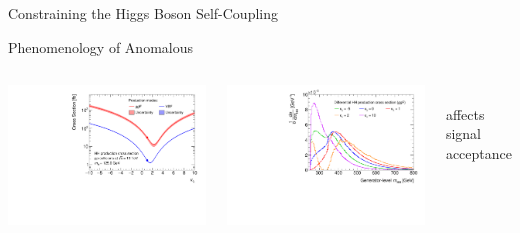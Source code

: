\documentclass[11pt, xcolor={dvipsnames}, aspectratio=169, notes]{beamer}
\begin{document}

\begin{frame}[standout]
  Constraining the Higgs Boson Self-Coupling
\end{frame}


\begin{frame}{Phenomenology of Anomalous \allbold{\klambda}}
  \begin{columns}[t]
    \centering

    \includegraphics[width=\textwidth]{self_coupling/hh_xsec}


    \centering

    \includegraphics[width=\textwidth]{self_coupling/hh_mhh_vs_klam}

    \\
    \ra affects signal acceptance

  \end{columns}
\end{frame}
\end{document}
